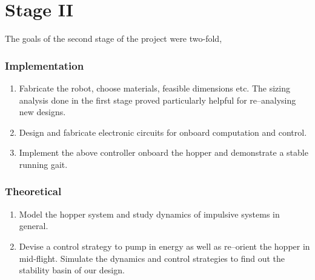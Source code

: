 \section{Stage II}
The goals of the second stage of the project were two-fold,
\subsubsection*{Implementation}
\begin{enumerate}
 \item
  Fabricate the robot, choose materials, feasible dimensions etc. The sizing analysis done in the first stage proved particularly helpful for re--analysing new designs.
  \item
  Design and fabricate electronic circuits for onboard computation and control.
  \item
  Implement the above controller onboard the hopper and demonstrate a stable running gait.
\end{enumerate}
\subsubsection*{Theoretical}
\begin{enumerate}
  \item 
  Model the hopper system and study dynamics of impulsive systems in general.
  \item
  Devise a control strategy to pump in energy as well as re--orient the hopper in mid-flight. Simulate the dynamics and control strategies to find out the stability basin of our design.
\end{enumerate}
 
\nocite{glodstein_book, upenn_hex, optimal_control_book, joao, ihop, bhat_control}









